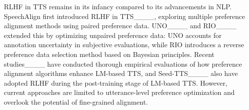 RLHF in TTS remains in its infancy compared to its advancements in NLP. SpeechAlign first introduced RLHF in TTS____, exploring multiple preference alignment methods using paired preference data. UNO____ and RIO____ extended this by optimizing unpaired preference data: UNO accounts for annotation uncertainty in subjective evaluations, while RIO introduces a reverse preference data selection method based on Bayesian principles. Recent studies____ have conducted thorough empirical evaluations of how preference alignment algorithms enhance LM-based TTS, and Seed-TTS____ also have adopted RLHF during the post-training stage of LM-based TTS. However, current approaches are limited to utterance-level preference optimization and overlook the potential of fine-grained alignment.